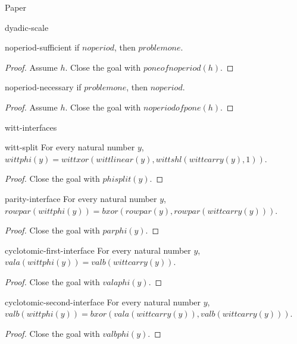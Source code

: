 \begin{lexlean}{Paper}
\begin{section}{dyadic-scale}
  \begin{theorem}{noperiod-sufficient}
  if \(noperiod\), then \(problemone\).
  \begin{proof}
  Assume \(h\).
  Close the goal with \(poneofnoperiod(h)\).
  \end{proof}
  \end{theorem}

  \begin{theorem}{noperiod-necessary}
  if \(problemone\), then \(noperiod\).
  \begin{proof}
  Assume \(h\).
  Close the goal with \(noperiodofpone(h)\).
  \end{proof}
  \end{theorem}
\end{section}

\begin{section}{witt-interfaces}
  \begin{theorem}{witt-split}
  For every natural number \(y\), \(wittphi(y) = wittxor(wittlinear(y), wittshl(wittcarry(y), 1))\).
  \begin{proof}
  Close the goal with \(phisplit(y)\).
  \end{proof}
  \end{theorem}

  \begin{theorem}{parity-interface}
  For every natural number \(y\), \(rowpar(wittphi(y)) = bxor(rowpar(y), rowpar(wittcarry(y)))\).
  \begin{proof}
  Close the goal with \(parphi(y)\).
  \end{proof}
  \end{theorem}

  \begin{theorem}{cyclotomic-first-interface}
  For every natural number \(y\), \(vala(wittphi(y)) = valb(wittcarry(y))\).
  \begin{proof}
  Close the goal with \(valaphi(y)\).
  \end{proof}
  \end{theorem}

  \begin{theorem}{cyclotomic-second-interface}
  For every natural number \(y\), \(valb(wittphi(y)) = bxor(vala(wittcarry(y)), valb(wittcarry(y)))\).
  \begin{proof}
  Close the goal with \(valbphi(y)\).
  \end{proof}
  \end{theorem}


\end{section}
\end{lexlean}
